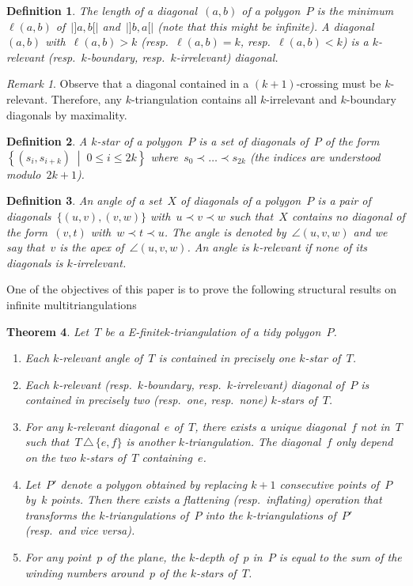 \documentclass{amsart}
\newtheorem{theorem}{Theorem}[section]
\newtheorem{definition}[theorem]{Definition}
\theoremstyle{remark}
\newtheorem{remark}{Remark}[section]
\newcommand{\darkblue}{\color{darkblue}} %
\newcommand{\defn}[1]{\textsl{\darkblue #1}} %
\newcommand{\set}[2]{\left\{ #1 \;\middle|\; #2 \right\}} %
\newcommand{\symdif}{\,\triangle\,} %
\newcommand{\viceversa}{\textit{vice versa}} %
\newcommand*{\ef}[0]{E-finite\xspace}
\newcommand*{\ktg}[0]{$k$-triangulation\xspace}
\newcommand{\cl}{\prec}
\newcommand{\vincent}[1]{\todo[color=blue!30]{#1 \\ \hfill --- V.}}
\begin{document}
\begin{definition}
The \defn{length} of a diagonal~$(a,b)$ of a polygon~$P$ is the minimum~$\ell(a,b)$ of~$|{]a,b[}|$ and~$|{]b,a[}|$ (note that this might be infinite).
A diagonal~$(a,b)$ with~$\ell(a,b) > k$ (resp.~$\ell(a,b) = k$, resp.~$\ell(a,b) < k$) is a \defn{$k$-relevant} (resp.~\defn{$k$-boundary}, resp.~\defn{$k$-irrelevant}) diagonal.
\end{definition}

\begin{remark}
Observe that a diagonal contained in a $(k+1)$-crossing must be $k$-relevant.
Therefore, any \ktg contains all $k$-irrelevant and $k$-boundary diagonals by maximality.
\end{remark}


\begin{definition}
A \defn{$k$-star} of a polygon~$P$ is a set of diagonals of~$P$ of the form~$\set{(s_i, s_{i+k})}{0 \le i \le 2k}$ where~$s_0 \cl \dots \cl s_{2k}$ (the indices are understood modulo~$2k+1$).
\end{definition}

\begin{definition}
An \defn{angle} of a set~$X$ of diagonals of a polygon~$P$ is a pair of diagonals~$\{(u,v), (v,w)\}$ with~$u \cl v \cl w$ such that~$X$ contains no diagonal of the form~$(v,t)$ with~$w \cl t \cl u$. The angle is denoted by~$\angle(u,v,w)$ and we say that~$v$ is the \defn{apex} of~$\angle(u,v,w)$. An angle is \defn{$k$-relevant} if none of its diagonals is $k$-irrelevant. %
\end{definition}

One of the objectives of this paper is to prove the following structural results on infinite multitriangulations

\begin{theorem}
\label{thm:structureInfinite}
Let~$T$ be a \ef \ktg of a tidy polygon~$P$.
\begin{enumerate}
\item Each $k$-relevant angle of~$T$ is contained in precisely one $k$-star of~$T$.
\item Each $k$-relevant (resp.~$k$-boundary, resp.~$k$-irrelevant) diagonal of~$P$ is contained in precisely two (resp.~one, resp.~none) $k$-stars of~$T$.
\item For any $k$-relevant diagonal~$e$ of~$T$, there exists a unique diagonal~$f$ not in~$T$ such that~$T \symdif \{e,f\}$ is another $k$-triangulation. The diagonal~$f$ only depend on the two $k$-stars of~$T$ containing~$e$.
\item Let~$P'$ denote a polygon obtained by replacing $k+1$ consecutive points of~$P$ by~$k$ points. Then there exists a flattening (resp.~inflating) operation that transforms the \ktg{}s of~$P$ into the \ktg{}s of~$P'$ (resp.~and \viceversa).
\item For any point~$p$ of the plane, the $k$-depth of~$p$ in~$P$ is equal to the sum of the winding numbers around~$p$ of the $k$-stars of~$T$.
\vincent{Vrai ?}
\end{enumerate}
\end{theorem}
\end{document}
